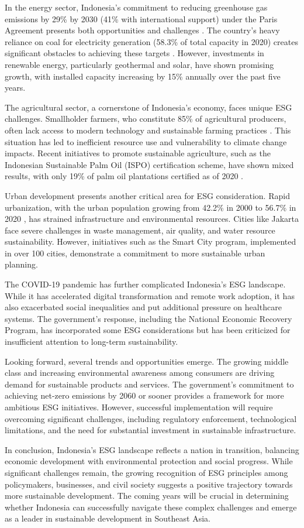 In the energy sector, Indonesia's commitment to reducing greenhouse gas emissions by 29\% by 2030 (41\% with international support) under the Paris Agreement presents both opportunities and challenges \cite{ref6}. The country's heavy reliance on coal for electricity generation (58.3\% of total capacity in 2020) creates significant obstacles to achieving these targets \cite{ref7}. However, investments in renewable energy, particularly geothermal and solar, have shown promising growth, with installed capacity increasing by 15\% annually over the past five years.

The agricultural sector, a cornerstone of Indonesia's economy, faces unique ESG challenges. Smallholder farmers, who constitute 85\% of agricultural producers, often lack access to modern technology and sustainable farming practices \cite{ref8}. This situation has led to inefficient resource use and vulnerability to climate change impacts. Recent initiatives to promote sustainable agriculture, such as the Indonesian Sustainable Palm Oil (ISPO) certification scheme, have shown mixed results, with only 19\% of palm oil plantations certified as of 2020 \cite{ref9}.

Urban development presents another critical area for ESG consideration. Rapid urbanization, with the urban population growing from 42.2\% in 2000 to 56.7\% in 2020 \cite{ref10}, has strained infrastructure and environmental resources. Cities like Jakarta face severe challenges in waste management, air quality, and water resource sustainability. However, initiatives such as the Smart City program, implemented in over 100 cities, demonstrate a commitment to more sustainable urban planning.

The COVID-19 pandemic has further complicated Indonesia's ESG landscape. While it has accelerated digital transformation and remote work adoption, it has also exacerbated social inequalities and put additional pressure on healthcare systems. The government's response, including the National Economic Recovery Program, has incorporated some ESG considerations but has been criticized for insufficient attention to long-term sustainability.

Looking forward, several trends and opportunities emerge. The growing middle class and increasing environmental awareness among consumers are driving demand for sustainable products and services. The government's commitment to achieving net-zero emissions by 2060 or sooner \cite{ref11} provides a framework for more ambitious ESG initiatives. However, successful implementation will require overcoming significant challenges, including regulatory enforcement, technological limitations, and the need for substantial investment in sustainable infrastructure.

In conclusion, Indonesia's ESG landscape reflects a nation in transition, balancing economic development with environmental protection and social progress. While significant challenges remain, the growing recognition of ESG principles among policymakers, businesses, and civil society suggests a positive trajectory towards more sustainable development. The coming years will be crucial in determining whether Indonesia can successfully navigate these complex challenges and emerge as a leader in sustainable development in Southeast Asia.